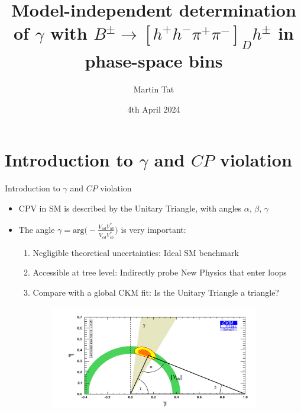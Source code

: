\documentclass[xcolor={dvipsnames}]{beamer}
\title[B2OC]{Model-independent determination of \texorpdfstring{$\gamma$}{gamma} with \texorpdfstring{$B^\pm\to[h^+h^-\pi^+\pi^-]_Dh^\pm$}{B2DhD2hhpipi} in phase-space bins}
\author[Martin Tat]{Martin Tat}
\institute[University of Oxford]{\normalsize University of Oxford\\ \vspace{0.3cm}\normalsize B2OC meeting}
\date{4th April 2024}
\begin{document}
\begin{frame}
  \titlepage
\end{frame}


\section{Introduction to \texorpdfstring{$\gamma$}{gamma} and \texorpdfstring{$C\!P$}{CP} violation}
\begin{frame}{Introduction to $\gamma$ and $C\!P$ violation}
  \begin{itemize}
    \setlength\itemsep{0.3em}
    \item{CPV in SM is described by the Unitary Triangle, with angles $\alpha$, $\beta$, $\gamma$}
    \item{The angle $\gamma = \text{arg}\Big(-\frac{V^{\phantom{*}}_{ud}V^*_{ub}}{V^{\phantom{*}}_{cd}V^*_{cb}}\Big)$ is very important:}
    \begin{enumerate}
    \setlength\itemsep{0.2em}
      \item{Negligible theoretical uncertainties: Ideal SM benchmark}
      \item{Accessible at tree level: Indirectly probe New Physics that enter loops}
      \item{Compare with a global CKM fit: Is the Unitary Triangle a triangle?}
    \end{enumerate}
  \end{itemize}
  \vspace{-0.2cm}
  \begin{figure}
    \centering
    \begin{subfigure}{0.5\textwidth}
      \centering
      \includegraphics[width = 1.0\textwidth]{Plots/ckmfitter_tree.png}

\end{subfigure}
\end{figure}
\end{frame}
\end{document}
